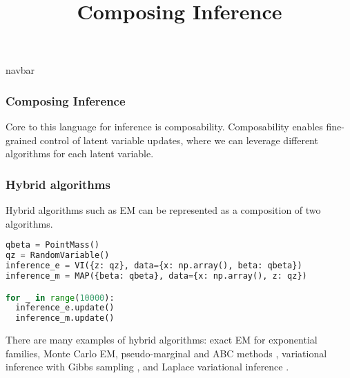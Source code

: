 \title{Composing Inference}

{{navbar}}

\subsubsection{Composing Inference}

Core to this language for inference is composability. Composability
enables fine-grained control of latent variable updates, where we can
leverage different algorithms for each latent variable.

\subsubsection{Hybrid algorithms}

Hybrid algorithms such as EM can be represented as a composition of two
algorithms.
\begin{lstlisting}[language=Python]
qbeta = PointMass()
qz = RandomVariable()
inference_e = VI({z: qz}, data={x: np.array(), beta: qbeta})
inference_m = MAP({beta: qbeta}, data={x: np.array(), z: qz})

for _ in range(10000):
  inference_e.update()
  inference_m.update()
\end{lstlisting}
There are many examples of hybrid algorithms:
exact EM for exponential families,
Monte Carlo EM,
pseudo-marginal and ABC methods \citep{andrieu2009pseudo},
variational inference with Gibbs sampling \citep{wang2012truncation},
and Laplace variational inference \citep{wang2013variational}.




